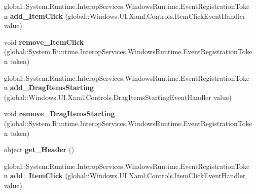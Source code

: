 \begin{DoxyCompactItemize}
global\+::\+System.\+Runtime.\+Interop\+Services.\+Windows\+Runtime.\+Event\+Registration\+Token {\bfseries add\+\_\+\+Item\+Click} (global\+::\+Windows.\+U\+I.\+Xaml.\+Controls.\+Item\+Click\+Event\+Handler value)
\item 
\mbox{\label{interface_windows_1_1_u_i_1_1_xaml_1_1_controls_1_1_i_list_view_base_a29b603576f74e0aaac225711b42e45e6}} 
void {\bfseries remove\+\_\+\+Item\+Click} (global\+::\+System.\+Runtime.\+Interop\+Services.\+Windows\+Runtime.\+Event\+Registration\+Token token)
\item 
\mbox{\label{interface_windows_1_1_u_i_1_1_xaml_1_1_controls_1_1_i_list_view_base_a3b355ad168b36f910e24d2c7ed82df17}} 
global\+::\+System.\+Runtime.\+Interop\+Services.\+Windows\+Runtime.\+Event\+Registration\+Token {\bfseries add\+\_\+\+Drag\+Items\+Starting} (global\+::\+Windows.\+U\+I.\+Xaml.\+Controls.\+Drag\+Items\+Starting\+Event\+Handler value)
\item 
\mbox{\label{interface_windows_1_1_u_i_1_1_xaml_1_1_controls_1_1_i_list_view_base_a98ffdf8ce44a2620717a8e03273d9029}} 
void {\bfseries remove\+\_\+\+Drag\+Items\+Starting} (global\+::\+System.\+Runtime.\+Interop\+Services.\+Windows\+Runtime.\+Event\+Registration\+Token token)
\item 
\mbox{\label{interface_windows_1_1_u_i_1_1_xaml_1_1_controls_1_1_i_list_view_base_a7a7ead1b392f70c5f393d65cf2a4de87}} 
object {\bfseries get\+\_\+\+Header} ()
\item 
\mbox{\label{interface_windows_1_1_u_i_1_1_xaml_1_1_controls_1_1_i_list_view_base_a381c8434df16fa7e46ceaa5d481c0653}} 
global\+::\+System.\+Runtime.\+Interop\+Services.\+Windows\+Runtime.\+Event\+Registration\+Token {\bfseries add\+\_\+\+Item\+Click} (global\+::\+Windows.\+U\+I.\+Xaml.\+Controls.\+Item\+Click\+Event\+Handler value)
\item 
\mbox{\label{interface_windows_1_1_u_i_1_1_xaml_1_1_controls_1_1_i_list_view_base_a29b603576f74e0aaac225711b42e45e6}} 

\end{DoxyCompactItemize}
